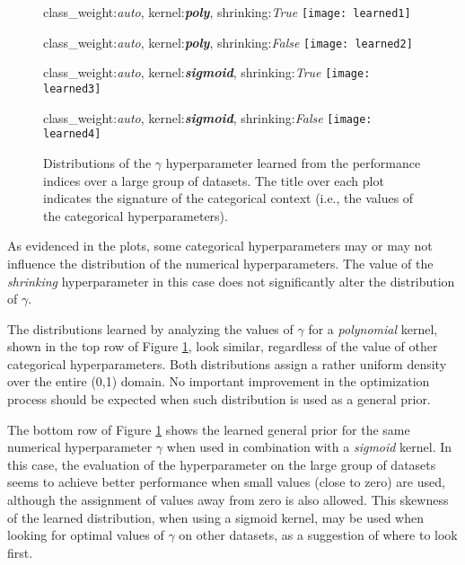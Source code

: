 \begin{figure}
	\begin{minipage}[t]{.48\textwidth}
		\centering
		\footnotesize class\_weight:\emph{auto}, kernel:{\bf \emph{poly}}, shrinking:\emph{True}
		\texttt{[image: learned1]}
	\end{minipage}
	\hfill
	\begin{minipage}[t]{.48\textwidth}
		\centering
		\footnotesize class\_weight:\emph{auto}, kernel:{\bf \emph{poly}}, shrinking:\emph{False}
		\texttt{[image: learned2]}
	\end{minipage}
	\vskip0.6cm
	\begin{minipage}[t]{.48\textwidth}
		\centering
		\footnotesize class\_weight:\emph{auto}, kernel:{\bf \emph{sigmoid}}, shrinking:\emph{True}
		\texttt{[image: learned3]}
	\end{minipage}
	\hfill
	\begin{minipage}[t]{.48\textwidth}
		\centering
		\footnotesize class\_weight:\emph{auto}, kernel:{\bf \emph{sigmoid}}, shrinking:\emph{False}
		\texttt{[image: learned4]}
	\end{minipage}
	\caption[Learned general priors]{Distributions of the $\gamma$ hyperparameter learned from the performance indices over
	a large group of datasets. The title over each plot indicates the signature of the categorical context (i.e., the values of the
	categorical hyperparameters).} \label{img:learned1}
	\label{fig:learned_gamma}
\end{figure}

As evidenced in the plots, some categorical hyperparameters may or may not influence the distribution of
the numerical hyperparameters. The value of the \emph{shrinking} hyperparameter in this case does
not significantly alter the distribution of $\gamma$.

The distributions learned by analyzing the values of $\gamma$ for a \emph{polynomial} kernel, shown in
the top row of Figure \ref{fig:learned_gamma}, look similar, regardless of the value of other categorical
hyperparameters. Both distributions assign a rather uniform density over the entire (0,1)
domain. No important improvement in the optimization process should be expected when such
distribution is used as a general prior.

The bottom row of Figure \ref{fig:learned_gamma} shows the learned general prior for the same numerical
hyperparameter $\gamma$ when used in combination with a \emph{sigmoid} kernel. In this case, the evaluation of the
hyperparameter on the large group of datasets seems to achieve better performance when small
values (close to zero) are used, although the assignment of values away from zero is also allowed.
This skewness of the learned distribution, when using a sigmoid kernel, may be used when looking for
optimal values of $\gamma$ on other datasets, as a suggestion of where to look first.
